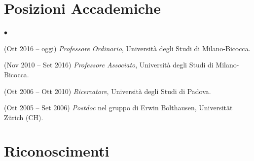 \documentclass[a4paper,11pt,oneside]{amsart}
\newenvironment{myitemize}{%
\begin{list}{$\bullet$}%
 	{%
	\setlength{\itemsep}{0.3em}%
	\setlength{\topsep}{0.3em}%
	\setlength{\partopsep}{0em}%
	\setlength{\parsep}{0em}%
	\setlength{\parskip}{0em}%
	\setlength\leftmargin{1.5em}%
	\setlength\labelwidth{1.1em}%
	\setlength{\labelsep}{0.4em}%
	}%
	}%
{\end{list}}
\renewenvironment{itemize}{
\begin{myitemize}}%
{\end{myitemize}}
\begin{document}
\section{Posizioni Accademiche}

\begin{itemize}
\item (Ott 2016 -- oggi) \emph{Professore Ordinario}, %
Università degli Studi di Milano-Bicocca.

\item (Nov 2010 -- Set 2016) \emph{Professore Associato}, %
Università degli Studi di Milano-Bicocca.

\item (Ott 2006 -- Ott 2010) \textit{Ricercatore}, %
Università degli Studi di Padova.

\item (Ott 2005 -- Set 2006) \textit{Postdoc} nel gruppo
di Erwin Bolthausen,
Universit\"at Z\"urich (CH).
\end{itemize}

\section{Riconoscimenti}
\end{document}

